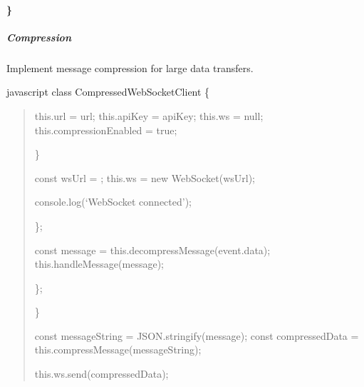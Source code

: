 \documentclass[letterpaper,10pt,english]{sphinxmanual}
\begin{document}
\paragraph{\}}
\label{\detokenize{api/websocket-api:id135}}

\subparagraph{Compression}
\label{\detokenize{api/websocket-api:compression}}
\sphinxAtStartPar
Implement message compression for large data transfers.

\sphinxAtStartPar
{\color{red}\bfseries{}\textasciigrave{}\textasciigrave{}}{\color{red}\bfseries{}\textasciigrave{}}javascript
class CompressedWebSocketClient \{
\begin{quote}
\begin{description}
\sphinxAtStartPar
this.url = url;
this.apiKey = apiKey;
this.ws = null;
this.compressionEnabled = true;

\end{description}

\sphinxAtStartPar
\}
\begin{description}
\sphinxAtStartPar
const wsUrl = ;
this.ws = new WebSocket(wsUrl);
\begin{description}
\sphinxAtStartPar
console.log(‘WebSocket connected’);

\end{description}

\sphinxAtStartPar
\};
\begin{description}
\sphinxAtStartPar
const message = this.decompressMessage(event.data);
this.handleMessage(message);

\end{description}

\sphinxAtStartPar
\};

\end{description}

\sphinxAtStartPar
\}
\begin{description}
\sphinxAtStartPar
const messageString = JSON.stringify(message);
const compressedData = this.compressMessage(messageString);
\begin{description}
\sphinxAtStartPar
this.ws.send(compressedData);

\end{description}


\end{description}
\end{quote}
\end{document}
